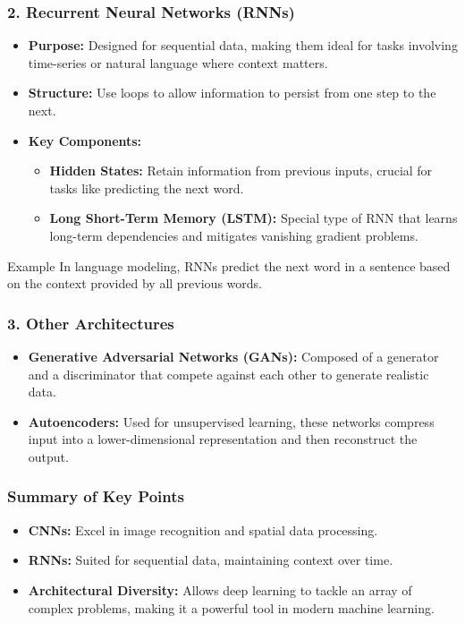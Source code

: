 \documentclass[aspectratio=169]{beamer}
\begin{document}
\begin{frame}
    \frametitle{2. Recurrent Neural Networks (RNNs)}
    \begin{itemize}
        \item \textbf{Purpose:} Designed for sequential data, making them ideal for tasks involving time-series or natural language where context matters.
        \item \textbf{Structure:} Use loops to allow information to persist from one step to the next.
        \item \textbf{Key Components:}
            \begin{itemize}
                \item \textbf{Hidden States:} Retain information from previous inputs, crucial for tasks like predicting the next word.
                \item \textbf{Long Short-Term Memory (LSTM):} Special type of RNN that learns long-term dependencies and mitigates vanishing gradient problems.
            \end{itemize}
    \end{itemize}
    \begin{block}{Example}
        In language modeling, RNNs predict the next word in a sentence based on the context provided by all previous words.
    \end{block}
\end{frame}

\begin{frame}
    \frametitle{3. Other Architectures}
    \begin{itemize}
        \item \textbf{Generative Adversarial Networks (GANs):} Composed of a generator and a discriminator that compete against each other to generate realistic data.
        \item \textbf{Autoencoders:} Used for unsupervised learning, these networks compress input into a lower-dimensional representation and then reconstruct the output.
    \end{itemize}
\end{frame}

\begin{frame}
    \frametitle{Summary of Key Points}
    \begin{itemize}
        \item \textbf{CNNs:} Excel in image recognition and spatial data processing.
        \item \textbf{RNNs:} Suited for sequential data, maintaining context over time.
        \item \textbf{Architectural Diversity:} Allows deep learning to tackle an array of complex problems, making it a powerful tool in modern machine learning.
    \end{itemize}
\end{frame}
\end{document}
